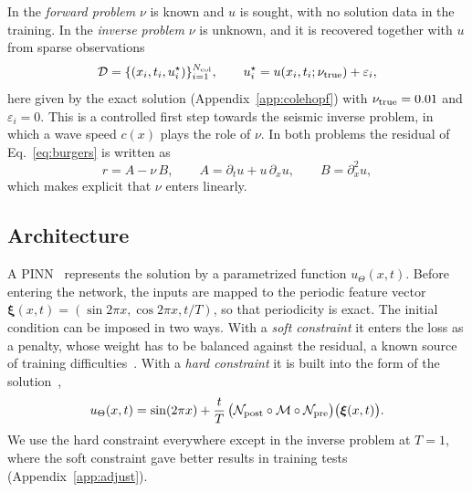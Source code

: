 \documentclass[floatfix,aps,pra,twocolumn,superscriptaddress,10pt,nofootinbib]{revtex4-2}
\newcommand{\Ncol}{N_{\rm col}}
\begin{document}
In the \emph{forward problem} $\nu$ is known and $u$ is sought, with no solution data in the training. In the \emph{inverse problem} $\nu$ is unknown, and it is recovered together with $u$ from sparse observations
\begin{equation}
  \mathcal D=\{(x_i,t_i,u^\star_i)\}_{i=1}^{\Ncol},\qquad u^\star_i=u(x_i,t_i;\nu_{\rm true})+\varepsilon_i,
  \label{eq:data}
\end{equation}
here given by the exact solution (Appendix~\ref{app:colehopf}) with $\nu_{\rm true}=0.01$ and $\varepsilon_i=0$. This is a controlled first step towards the seismic inverse problem, in which a wave speed $c(x)$ plays the role of $\nu$. In both problems the residual of Eq.~\eqref{eq:burgers} is written as
\begin{equation}
  r=A-\nu\,B,\qquad A=\partial_tu+u\,\partial_xu,\qquad B=\partial_x^2u,
  \label{eq:residual}
\end{equation}
which makes explicit that $\nu$ enters linearly.

\subsection{Architecture}\label{sec:arch}
A PINN~\cite{raissi2019physics,karniadakis2021physics} represents the solution by a parametrized function $u_\Theta(x,t)$. Before entering the network, the inputs are mapped to the periodic feature vector $\bm\xi(x,t)=(\sin2\pi x,\cos2\pi x,t/T)$, so that periodicity is exact. The initial condition can be imposed in two ways. With a \emph{soft constraint} it enters the loss as a penalty, whose weight has to be balanced against the residual, a known source of training difficulties~\cite{wang2021understanding,krishnapriyan2021characterizing}. With a \emph{hard constraint} it is built into the form of the solution~\cite{lagaris1998artificial},
\begin{equation}
  u_\Theta(x,t)=\sin(2\pi x)+\frac{t}{T}\,\big(\mathcal N_{\rm post}\circ\mathcal M\circ\mathcal N_{\rm pre}\big)\big(\bm\xi(x,t)\big).
  \label{eq:composition}
\end{equation}
We use the hard constraint everywhere except in the inverse problem at $T=1$, where the soft constraint gave better results in training tests (Appendix~\ref{app:adjust}).
\end{document}
